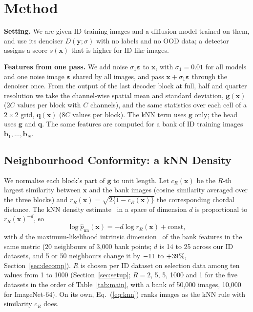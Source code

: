 \documentclass{article}
\newcommand{\veps}{\boldsymbol{\varepsilon}}
\begin{document}
\section{Method}
\label{sec:method}
\textbf{Setting.} We are given ID training images and a diffusion model trained on them, and use its denoiser $D(\mathbf{y};\sigma)$ with no labels and no OOD data; a detector assigns a score $s(\mathbf{x})$ that is higher for ID-like images.

\textbf{Features from one pass.} We add noise $\sigma_1\veps$ to $\mathbf{x}$, with $\sigma_1=0.01$ for all models and one noise image $\veps$ shared by all images, and pass $\mathbf{x}+\sigma_1\veps$ through the denoiser once. From the output of the last decoder block at full, half and quarter resolution we take the channel-wise spatial mean and standard deviation, $\mathbf{g}(\mathbf{x})$ ($2C$ values per block with $C$ channels), and the same statistics over each cell of a $2\times2$ grid, $\mathbf{q}(\mathbf{x})$ ($8C$ values per block). The kNN term uses $\mathbf{g}$ only; the head uses $\mathbf{g}$ and $\mathbf{q}$. The same features are computed for a bank of ID training images $\mathbf{b}_1,\dots,\mathbf{b}_N$.

\subsection{Neighbourhood Conformity: a kNN Density}
\label{sec:knn}
We normalise each block's part of $\mathbf{g}$ to unit length. Let $c_R(\mathbf{x})$ be the $R$-th largest similarity between $\mathbf{x}$ and the bank images (cosine similarity averaged over the three blocks) and $r_R(\mathbf{x})=\sqrt{2\{1-c_R(\mathbf{x})\}}$ the corresponding chordal distance. The kNN density estimate~\cite{loftsgaarden1965knn} in a space of dimension $d$ is proportional to $r_R(\mathbf{x})^{-d}$, so
\begin{equation}
\log\hat p_{\mathrm{nn}}(\mathbf{x})=-d\log r_R(\mathbf{x})+\mathrm{const},
\label{eq:knn}
\end{equation}
with $d$ the maximum-likelihood intrinsic dimension~\cite{levina2004mle} of the bank features in the same metric (20 neighbours of 3{,}000 bank points; $d$ is 14 to 25 across our ID datasets, and 5 or 50 neighbours change it by $-11$ to $+39$\%, Section~\ref{sec:decomp}). $R$ is chosen per ID dataset on selection data among ten values from 1 to 1000 (Section~\ref{sec:setup}; $R=2$, 5, 5, 1000 and 1 for the five datasets in the order of Table~\ref{tab:main}, with a bank of 50{,}000 images, 10{,}000 for ImageNet-64). On its own, Eq.~(\ref{eq:knn}) ranks images as the kNN rule with similarity $c_R$ does.
\end{document}
